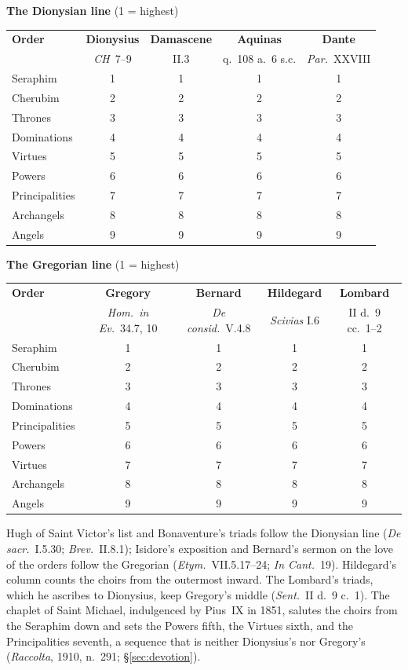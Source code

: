 \begin{center}
\footnotesize
\textbf{The Dionysian line} (1 = highest)\\[0.4\baselineskip]
\begin{tabular}{@{}lcccc@{}}
\toprule
\textbf{Order} & \textbf{Dionysius} & \textbf{Damascene} & \textbf{Aquinas} & \textbf{Dante}\\
 & \emph{CH}~7--9 & II.3 & q.~108 a.~6 s.c. & \emph{Par.}\ XXVIII\\
\midrule
Seraphim & 1 & 1 & 1 & 1\\
Cherubim & 2 & 2 & 2 & 2\\
Thrones & 3 & 3 & 3 & 3\\
Dominations & 4 & 4 & 4 & 4\\
Virtues & 5 & 5 & 5 & 5\\
Powers & 6 & 6 & 6 & 6\\
Principalities & 7 & 7 & 7 & 7\\
Archangels & 8 & 8 & 8 & 8\\
Angels & 9 & 9 & 9 & 9\\
\bottomrule
\end{tabular}
\end{center}

\begin{center}
\footnotesize
\textbf{The Gregorian line} (1 = highest)\\[0.4\baselineskip]
\begin{tabular}{@{}lcccc@{}}
\toprule
\textbf{Order} & \textbf{Gregory} & \textbf{Bernard} & \textbf{Hildegard} & \textbf{Lombard}\\
 & \emph{Hom.\ in Ev.}\ 34.7, 10 & \emph{De consid.}\ V.4.8 & \emph{Scivias} I.6 & II d.~9 cc.~1--2\\
\midrule
Seraphim & 1 & 1 & 1 & 1\\
Cherubim & 2 & 2 & 2 & 2\\
Thrones & 3 & 3 & 3 & 3\\
Dominations & 4 & 4 & 4 & 4\\
Principalities & 5 & 5 & 5 & 5\\
Powers & 6 & 6 & 6 & 6\\
Virtues & 7 & 7 & 7 & 7\\
Archangels & 8 & 8 & 8 & 8\\
Angels & 9 & 9 & 9 & 9\\
\bottomrule
\end{tabular}
\end{center}

Hugh of Saint Victor's list and Bonaventure's triads follow the Dionysian
line (\emph{De sacr.}\ I.5.30; \emph{Brev.}\ II.8.1); Isidore's exposition
and Bernard's sermon on the love of the orders follow the Gregorian
(\emph{Etym.}\ VII.5.17--24; \emph{In Cant.}\ 19). Hildegard's column
counts the choirs from the outermost inward. The Lombard's triads, which he
ascribes to Dionysius, keep Gregory's middle (\emph{Sent.}\ II d.~9 c.~1).
The chaplet of Saint Michael, indulgenced by Pius~IX in 1851, salutes the
choirs from the Seraphim down and sets the Powers fifth, the Virtues
sixth, and the Principalities seventh, a sequence that is neither
Dionysius's nor Gregory's (\emph{Raccolta}, 1910, n.~291;
\S\ref{sec:devotion}).

